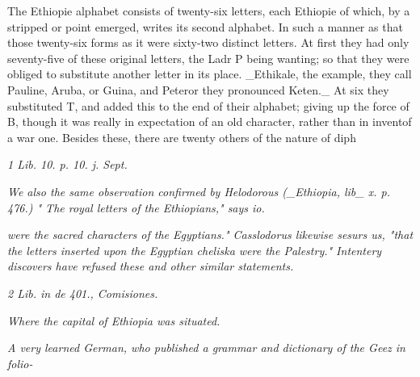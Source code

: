 The Ethiopie alphabet consists of twenty-six letters, each Ethiopie of which, by a stripped or point emerged, writes its second alphabet. In such a manner as that those twenty-six forms as it were sixty-two distinct letters. At first they had only seventy-five of these original letters, the Ladr P being wanting; so that they were obliged to substitute another letter in its place. \_Ethikale, the example, they call Pauline, Aruba, or Guina, and Peteror they pronounced Keten.\_ At six they substituted T, and added this to the end of their alphabet; giving up the force of B, though it was really in expectation of an old character, rather than in inventof a war one. Besides these, there are twenty others of the nature of diph\par\medskip
{\small\itshape 1 Lib. 10. p. 10. j. Sept.\par}\medskip
{\small\itshape We also the same observation confirmed by Helodorous (\_Ethiopia, lib\_ x. p. 476.) " The royal letters of the Ethiopians," says io.\par}\medskip
{\small\itshape were the sacred characters of the Egyptians." Casslodorus likewise sesurs us, "that the letters inserted upon the Egyptian cheliska were the Palestry." Intentery discovers have refused these and other similar statements.\par}\medskip
{\small\itshape 2 Lib. in de 401., Comisiones.\par}\medskip
{\small\itshape Where the capital of Ethiopia was situated.\par}\medskip
{\small\itshape A very learned German, who published a grammar and dictionary of the Geez in folio-\par}\medskip
